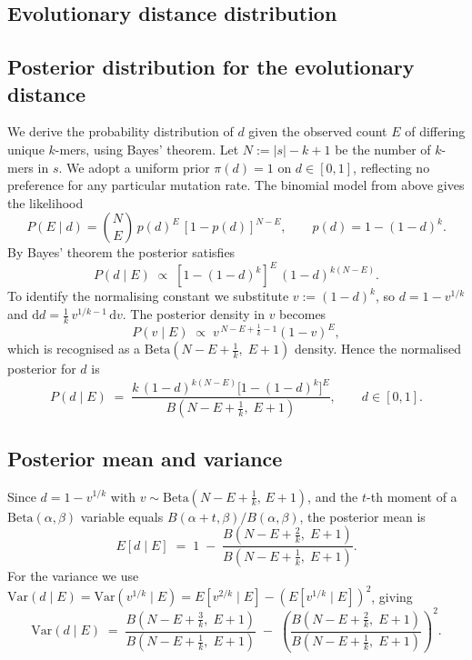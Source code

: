 \documentclass[pdflatex,sn-vancouver-num]{sn-jnl}
\begin{document}
\begin{appendices}

\section{Evolutionary distance distribution}\label{distdist}

\subsection{Posterior distribution for the evolutionary distance}

We derive the probability distribution of $d$ given the observed count $E$ of differing unique $k$-mers, using Bayes' theorem. Let $N := |s|-k+1$ be the number of $k$-mers in $s$. We adopt a uniform prior $\pi(d) = 1$ on $d\in[0,1]$, reflecting no preference for any particular mutation rate. The binomial model from above gives the likelihood
\[
  P(E \mid d) = \binom{N}{E}\,p(d)^E\,[1-p(d)]^{N-E}, \qquad p(d) = 1-(1-d)^k.
\]
By Bayes' theorem the posterior satisfies
\[
  P(d \mid E) \;\propto\; [1-(1-d)^k]^E\,(1-d)^{k(N-E)}.
\]
To identify the normalising constant we substitute $v := (1-d)^k$, so $d = 1-v^{1/k}$ and $\mathrm{d}d = \frac{1}{k}\,v^{1/k-1}\,\mathrm{d}v$. The posterior density in $v$ becomes
\[
  P(v \mid E) \;\propto\; v^{\,N-E+\frac{1}{k}-1}(1-v)^{E},
\]
which is recognised as a $\mathrm{Beta}\!\left(N-E+\tfrac{1}{k},\;E+1\right)$ density. Hence the normalised posterior for $d$ is
\begin{equation}
  P(d \mid E) \;=\;
  \frac{k\,(1-d)^{k(N-E)}\bigl[1-(1-d)^k\bigr]^E}
       {B\!\left(N-E+\tfrac{1}{k},\;E+1\right)},
  \qquad d\in[0,1].
  \label{eq:dposterior}
\end{equation}

\subsection{Posterior mean and variance}

Since $d = 1-v^{1/k}$ with $v\sim\mathrm{Beta}\!\left(N-E+\tfrac{1}{k},\,E+1\right)$, and the $t$-th moment of a $\mathrm{Beta}(\alpha,\beta)$ variable equals $B(\alpha+t,\beta)/B(\alpha,\beta)$, the posterior mean is
\begin{equation}
  E[d\mid E] \;=\; 1 \;-\;
  \frac{B\!\left(N-E+\tfrac{2}{k},\;E+1\right)}
       {B\!\left(N-E+\tfrac{1}{k},\;E+1\right)}.
  \label{eq:dpostmean}
\end{equation}
For the variance we use $\mathrm{Var}(d\mid E) = \mathrm{Var}(v^{1/k}\mid E) = E[v^{2/k}\mid E]-(E[v^{1/k}\mid E])^2$, giving
\begin{equation}
  \mathrm{Var}(d\mid E) \;=\;
  \frac{B\!\left(N-E+\tfrac{3}{k},\;E+1\right)}
       {B\!\left(N-E+\tfrac{1}{k},\;E+1\right)}
  \;-\;
  \left(\frac{B\!\left(N-E+\tfrac{2}{k},\;E+1\right)}
             {B\!\left(N-E+\tfrac{1}{k},\;E+1\right)}\right)^{\!2}.
  \label{eq:dpostvar}
\end{equation}


\end{appendices}
\end{document}
